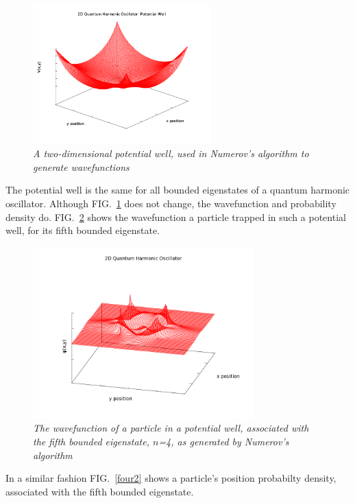 \documentclass[aps,prl,twocolumn,superscriptaddress]{revtex4-1}
\begin{document}
\begin{figure}[H]
  \begin{center}
\centerline{\includegraphics[width=2.7in]{2D_potentialwell_wo.png}}
\caption{\it \small{A two-dimensional potential well, used in Numerov's algorithm to generate wavefunctions \label{2Dpot}}}
  \end{center}
\end{figure}

The potential well is the same for all bounded eigenstates of a quantum harmonic oscillator.  Although FIG.~\ref{2Dpot} does 
not change, the wavefunction and probability density do.  FIG.~\ref{four} shows the wavefunction a particle trapped in 
such a potential well, for its fifth bounded eigenstate.

\begin{figure}[h!]
  \begin{center}
\centerline{\includegraphics[width=3.35in]{2D_psi_n4.png}}
\caption{\it \small{The wavefunction of a particle in a potential well, associated with the fifth bounded eigenstate, $n$=4, as generated by Numerov's algorithm \label{four}}}
  \end{center}
\end{figure}

In a similar fashion FIG.~\ref{four2} shows a particle's position probabilty density, associated with the fifth bounded eigenstate.
\end{document}
